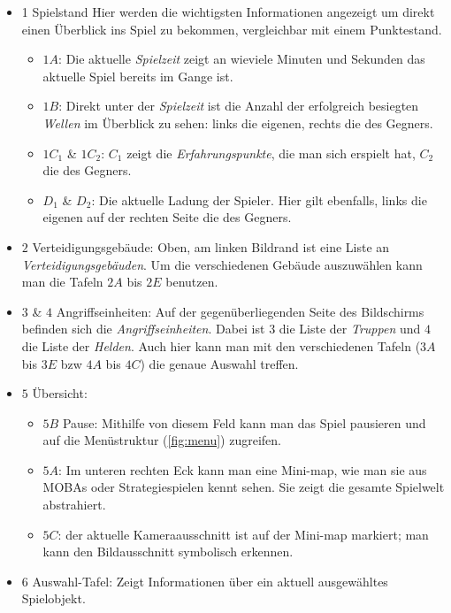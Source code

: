 \begin{itemize}
	\item{1 Spielstand} Hier werden die wichtigsten Informationen angezeigt um direkt einen Überblick ins Spiel zu bekommen, vergleichbar mit einem Punktestand.
	\begin{itemize}
		\item{$1 A$: Die aktuelle \textit{Spielzeit} zeigt an wieviele Minuten und Sekunden das aktuelle Spiel bereits im Gange ist.}
		\item{$1 B$: Direkt unter der \textit{Spielzeit} ist die Anzahl der erfolgreich besiegten \textit{Wellen} im Überblick zu sehen: links die eigenen, rechts die des Gegners.}
		\item{$1 C_{1}$ \& $1C_{2}$:} $C_{1}$ zeigt die \textit{Erfahrungspunkte}, die man sich erspielt hat, $C_{2}$ die des Gegners.
		\item{$D_{1}$ \& $D_{2}$:} Die aktuelle Ladung der Spieler. Hier gilt ebenfalls, links die eigenen auf der rechten Seite die des Gegners.
	\end{itemize}
	\item {$2$ Verteidigungsgebäude:} Oben, am linken Bildrand ist eine Liste an \textit{Verteidigungsgebäuden}. Um die verschiedenen Gebäude auszuwählen kann man die Tafeln $2 A$ bis $2 E$ benutzen.
	\item {$3$ \& $4$ Angriffseinheiten:} Auf der gegenüberliegenden Seite des Bildschirms befinden sich die \textit{Angriffseinheiten}. Dabei ist $3$ die Liste der \textit{Truppen} und $4$ die Liste der \textit{Helden}. Auch hier kann man mit den verschiedenen Tafeln ($3 A$ bis $3 E$ bzw $4 A$ bis $4 C$) die genaue Auswahl treffen.
	\item {$5$ Übersicht:}
	\begin{itemize}
		\item{$5 B$ Pause: Mithilfe von diesem Feld kann man das Spiel pausieren und auf die Menüstruktur (\ref{fig:menu}) zugreifen.}
		\item{$5 A$: Im unteren rechten Eck kann man eine Mini-map, wie man sie aus MOBAs oder Strategiespielen kennt sehen. Sie zeigt die gesamte Spielwelt abstrahiert.}
		\item{$5 C$: der aktuelle Kameraausschnitt ist auf der Mini-map markiert; man kann den Bildausschnitt symbolisch erkennen.}
	\end{itemize}
	\item {$6$ Auswahl-Tafel: Zeigt Informationen über ein aktuell ausgewähltes Spielobjekt.}	\begin{itemize}

\end{itemize}
\end{itemize}
